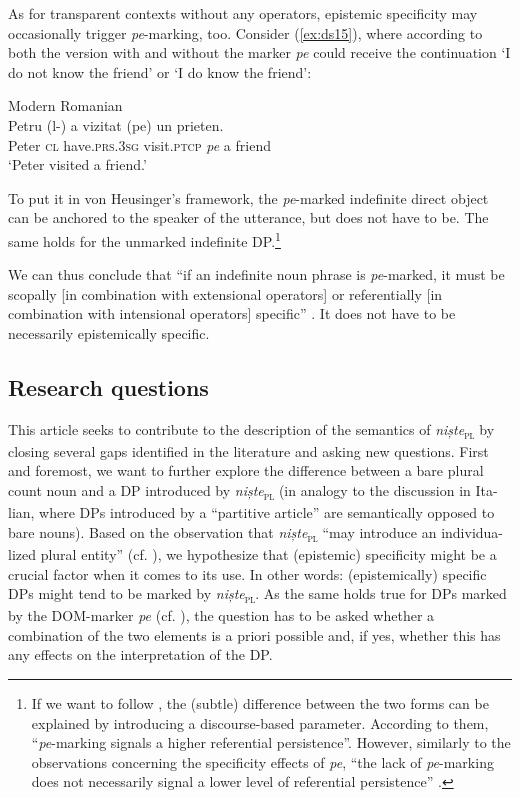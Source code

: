 \documentclass[output=paper,colorlinks,citecolor=brown]{langscibook}
\begin{document}
As for transparent contexts without any operators, epistemic specificity may occasionally trigger \textit{pe}-marking, too. Consider (\ref{ex:ds15}), where according to \citet[443]{HeusingerChiriacescu2013} both the version with and without the marker \textit{pe} could receive the continuation ‘I do not know the friend’ or ‘I do know the friend’:

\ea\label{ex:ds15} Modern Romanian\\
\gll Petru (l-) a               vizitat      (pe) un prieten.\\
     Peter  \textsc{cl} have.\textsc{prs.3sg} visit.\textsc{ptcp} \textit{pe}   a   friend\\
\glt ‘Peter visited a friend.’
\z


To put it in von Heusinger’s framework, the \textit{pe}-marked indefinite direct object can be anchored to the speaker of the utterance, but does not have to be. The same holds for the unmarked indefinite DP.\footnote{If we want to follow \citet[443]{HeusingerChiriacescu2013}, the (subtle) difference between the two forms can be explained by introducing a discourse-based parameter. According to them, “\textit{pe}-marking signals a higher referential persistence”. However, similarly to the observations concerning the specificity effects of \textit{pe}, “the lack of \textit{pe}-marking does not necessarily signal a lower level of referential persistence” \citep[315]{ChiriacescuHeusinger2010}.}

We can thus conclude that “if an indefinite noun phrase is \textit{pe}-marked, it must be scopally [in combination with extensional operators] or referentially [in combination with intensional operators] specific” \citep[305]{ChiriacescuHeusinger2010}. It does not have to be necessarily epistemically specific.

\subsection{Research questions}\label{sec:ds2.5}

This article seeks to contribute to the description of the semantics of \textit{niște}\textsubscript{\textsc{pl}} by closing several gaps identified in the literature and asking new questions. First and foremost, we want to further explore the difference between a bare plural count noun and a DP introduced by \textit{niște}\textsubscript{\textsc{pl}} (in analogy to the discussion in Ita- lian, where DPs introduced by a “partitive article” are semantically opposed to bare nouns). Based on the observation that \textit{niște}\textsubscript{\textsc{pl}} “may introduce an individua- lized plural entity” (cf. ), we hypothesize that (epistemic) specificity might be a crucial factor when it comes to its use. In other words: (epistemically) specific DPs might tend to be marked by \textit{niște}\textsubscript{\textsc{pl}}. As the same holds true for DPs marked by the DOM-marker \textit{pe} (cf. ), the question has to be asked whether a combination of the two elements is a priori possible and, if yes, whether this has any effects on the interpretation of the DP.
\end{document}
